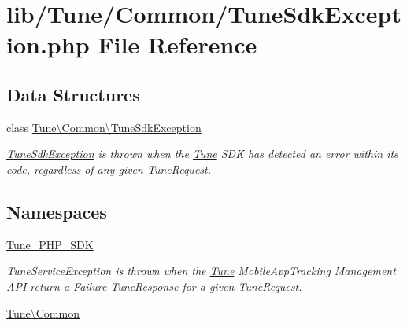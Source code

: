 \hypertarget{TuneSdkException_8php}{\section{lib/\-Tune/\-Common/\-Tune\-Sdk\-Exception.php File Reference}
\label{TuneSdkException_8php}
}
\subsection*{Data Structures}
\begin{DoxyCompactItemize}
\item 
class \hyperlink{classTune_1_1Common_1_1TuneSdkException}{Tune\textbackslash{}\-Common\textbackslash{}\-Tune\-Sdk\-Exception}
\begin{DoxyCompactList}\small\item\em \hyperlink{classTune_1_1Common_1_1TuneSdkException}{Tune\-Sdk\-Exception} is thrown when the \hyperlink{namespaceTune}{Tune} S\-D\-K has detected an error within its code, regardless of any given Tune\-Request. \end{DoxyCompactList}\end{DoxyCompactItemize}
\subsection*{Namespaces}
\begin{DoxyCompactItemize}
\item 
\hyperlink{namespaceTune__PHP__SDK}{Tune\-\_\-\-P\-H\-P\-\_\-\-S\-D\-K}
\begin{DoxyCompactList}\small\item\em Tune\-Service\-Exception is thrown when the \hyperlink{namespaceTune}{Tune} Mobile\-App\-Tracking Management A\-P\-I return a Failure Tune\-Response for a given Tune\-Request. \end{DoxyCompactList}\item 
\hyperlink{namespaceTune_1_1Common}{Tune\textbackslash{}\-Common}
\end{DoxyCompactItemize}
